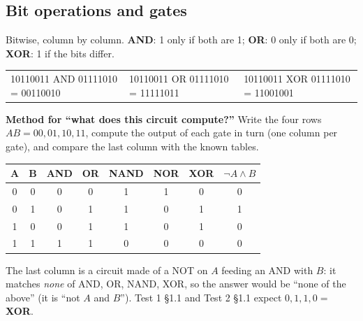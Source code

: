 \documentclass{fkt-notes}
\begin{document}
\subsection{Bit operations and gates}
Bitwise, column by column. \textbf{AND}: 1 only if both are 1; \textbf{OR}: 0 only if both are 0;
\textbf{XOR}: 1 if the bits differ.
\begin{center}
  \small\ttfamily
  \begin{tabular}{@{}lll@{}}
    10110011 AND 01111010 = 00110010 &
    10110011 OR 01111010 = 11111011  &
    10110011 XOR 01111010 = 11001001
  \end{tabular}
\end{center}
\textbf{Method for ``what does this circuit compute?''} Write the four rows
$AB=00,01,10,11$, compute the output of each gate in turn (one column per gate), and
compare the last column with the known tables.
\begin{center}
  \small\renewcommand{\arraystretch}{1.1}
  \begin{tabular}{@{}cc|c|c|c|c|c|c@{}}
    A & B & AND & OR & NAND & NOR & XOR & $\neg A\wedge B$ \\\hline
    0 & 0 & 0   & 0  & 1    & 1   & 0   & 0                \\
    0 & 1 & 0   & 1  & 1    & 0   & 1   & 1                \\
    1 & 0 & 0   & 1  & 1    & 0   & 1   & 0                \\
    1 & 1 & 1   & 1  & 0    & 0   & 0   & 0                \\
  \end{tabular}
\end{center}
The last column is a circuit made of a NOT on $A$ feeding an AND with $B$: it
matches \emph{none} of AND, OR, NAND, XOR, so the answer would be ``none of the above''
(it is ``not $A$ and $B$''). Test 1 \S1.1 and Test 2 \S1.1 expect
$0,1,1,0=$ \textbf{XOR}.
\end{document}
